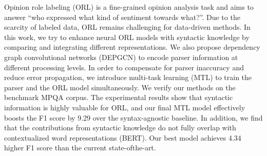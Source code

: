 Opinion role labeling (ORL) is a fine-grained opinion analysis task and aims to answer ``who expressed what kind of sentiment towards what?''. Due to the scarcity of labeled data, ORL remains challenging for data-driven methods. In this work, we try to enhance neural ORL models with syntactic knowledge by comparing and integrating different representations. We also propose dependency graph convolutional networks (DEPGCN) to encode parser information at different processing levels. In order to compensate for parser inaccuracy and reduce error propagation, we introduce multi-task learning (MTL) to train the parser and the ORL model simultaneously. We verify our methods on the benchmark MPQA corpus. The experimental results show that syntactic information is highly valuable for ORL, and our final MTL model effectively boosts the F1 score by 9.29 over the syntax-agnostic baseline. In addition, we find that the contributions from syntactic knowledge do not fully overlap with contextualized word representations (BERT). Our best model achieves 4.34 higher F1 score than the current state-ofthe-art.
